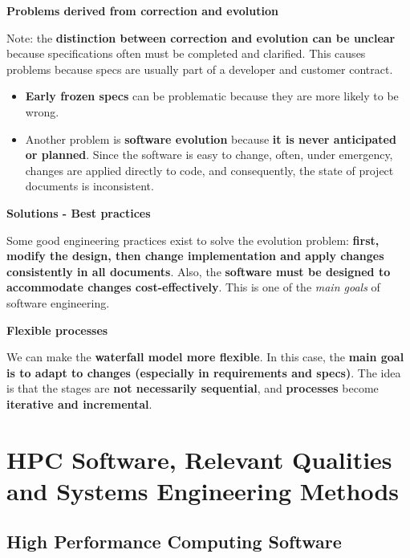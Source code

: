 \documentclass[a4paper]{article}
\begin{document}
    \begin{flushleft}
        \textcolor{Red2}{\textbf{ Problems derived from correction and evolution}}
    \end{flushleft}
    Note: the \textbf{distinction between correction and evolution can be unclear} because specifications often must be completed and clarified. This causes problems because specs are usually part of a developer and customer contract. 
    \begin{itemize}
        \item \textbf{Early frozen specs} can be problematic because they are more likely to be wrong.
        \item Another problem is \textbf{software evolution} because \textbf{it is never anticipated or planned}. Since the software is easy to change, often, under emergency, changes are applied directly to code, and consequently, the state of project documents is inconsistent.
    \end{itemize}

    \begin{flushleft}
        \textcolor{Green3}{ \textbf{Solutions - Best practices}}
    \end{flushleft}
    Some good engineering practices exist to solve the evolution problem: \textbf{first, modify the design, then change implementation and apply changes consistently in all documents}. Also, the \textbf{software must be designed to accommodate changes cost-effectively}. This is one of the \emph{main goals} of software engineering.

    \begin{flushleft}
        \textcolor{Green3}{ \textbf{Flexible processes}}
    \end{flushleft}
    We can make the \textbf{waterfall model more flexible}. In this case, the \textbf{main goal is to adapt to changes (especially in requirements and specs)}.
    The idea is that the stages are \textbf{not necessarily sequential}, and \textbf{processes} become \textbf{iterative and incremental}.

    \newpage

    \section{HPC Software, Relevant Qualities and Systems Engineering Methods}

    \subsection{High Performance Computing Software}
\end{document}
